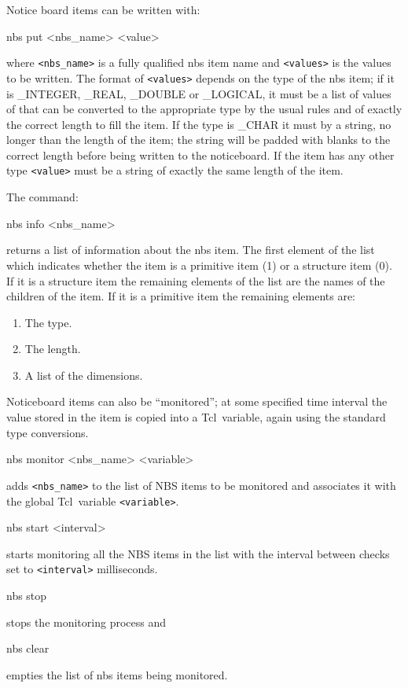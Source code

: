 \documentclass[twoside,11pt,nolof]{starlink}
\providecommand{\Tcl}{{\textsf{Tcl}}}
\begin{document}
Notice board items can be written with:
\begin{terminalv}
nbs put <nbs_name> <value>
\end{terminalv}
where \texttt{<nbs\_name>} is a fully qualified nbs item name and \texttt{<values>} is the values to be written.
The format of \texttt{<values>} depends on the type of the nbs item; if it
is \_INTEGER, \_REAL, \_DOUBLE or \_LOGICAL, it must be a list of values of
that can be converted to the appropriate type by the usual rules and of
exactly the correct length to fill the item. If the type is \_CHAR it must
by a string, no longer than the length of the item; the string will be padded
with blanks to the correct length before being written to the noticeboard. If
the item has any other type \texttt{<value>} must be a string of exactly the same
length of the item.

The command:
\begin{terminalv}
nbs info <nbs_name>
\end{terminalv}
returns a list of information about the nbs item. The first element of the list
which indicates whether the item is a primitive item (1) or a structure item
(0). If it is a structure item the remaining elements of the list are the names
of the children of the item. If it is a primitive item the remaining elements
are:
\begin{enumerate}
\item The type.
\item The length.
\item A list of the dimensions.
\end{enumerate}

Noticeboard items can also be ``monitored''; at some specified time
interval the
value stored in the item is copied into a \Tcl\ variable, again using the
standard type conversions.
\begin{terminalv}
nbs monitor <nbs_name> <variable>
\end{terminalv}
adds \texttt{<nbs\_name>} to the list of NBS items to be monitored and
associates it with the global \Tcl\ variable \texttt{<variable>}.
\begin{terminalv}
nbs start <interval>
\end{terminalv}
starts monitoring all the NBS items in the list with the interval between
checks set to \texttt{<interval>} milliseconds.

\begin{terminalv}
nbs stop
\end{terminalv}
stops the monitoring process and
\begin{terminalv}
nbs clear
\end{terminalv}
empties the list of nbs items being monitored.
\end{document}
